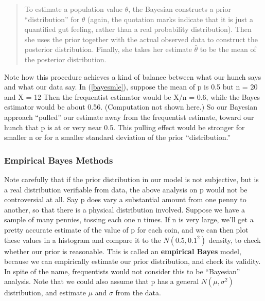 \begin{quote}
To estimate a population value $\theta$, the Bayesian constructs a prior
``distribution'' for $\theta$ (again, the quotation marks indicate that
it is just a quantified gut feeling, rather than a real probability
distribution).  Then she uses the prior together with the actual
observed data to construct the posterior distribution.  Finally, she
takes her estimate $\hat{\theta}$ to be the mean of the posterior
distribution.
\end{quote}

Note how this procedure achieves a kind of balance between what our
hunch says and what our data say.  In (\ref{bayesmle}), suppose the mean
of p is 0.5 but n = 20 and X = 12 Then the frequentist estimator would
be X/n = 0.6, while the Bayes estimator would be about 0.56.
(Computation not shown here.) So our Bayesian approach ``pulled'' our
estimate away from the frequentist estimate, toward our hunch that p is
at or very near 0.5.  This pulling effect would be stronger for smaller n
or for a smaller standard deviation of the prior ``distribution.''

% 
% 

\subsubsection{Empirical Bayes Methods}
\label{empbayes}

Note carefully that if the prior distribution in our model is not
subjective, but is a real distribution verifiable from data, the above
analysis on p would not be controversial at all.  Say p does vary a
substantial amount from one penny to another, so that there is a
physical distribution involved.  Suppose we have a sample of many pennies,
tossing each one n times.   If n is very large, we'll get a pretty
accurate estimate of the value of p for each coin, and we can then plot
these values in a histogram and compare it to the $N(0.5,0.1^2)$
density, to check whether our prior is reasonable.  This is called an
{\bf empirical Bayes} model, because we can empirically estimate our
prior distribution, and check its validity.  In spite of the name,
frequentists would not consider this to be ``Bayesian'' analysis.
Note that we could also assume that p has a general $N(\mu, \sigma^2)$
distribution, and estimate $\mu$ and $\sigma$ from the data.  

